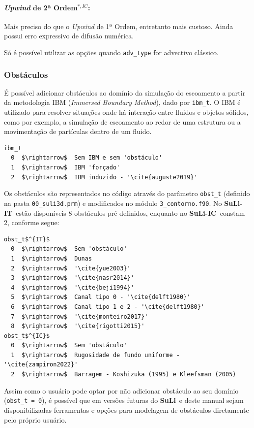 \documentclass[12pt, a4paper]{article}
\newcommand{\SL}{{\bf SuLi}}
\newcommand{\SLIT}{{\bf SuLi-IT}}
\newcommand{\SLIC}{{\bf SuLi-IC}}
\begin{document}
\paragraph{\textit{Upwind} de 2ª Ordem$^{*,IC}$:} Mais preciso do que o \textit{Upwind} de 1ª Ordem, entretanto mais custoso. Ainda possui erro expressivo de difusão numérica. 

\vspace{0.5cm}
\noindent *Só é possível utilizar as opções quando \verb|adv_type| for advectivo clássico.

\subsubsection{Obstáculos} \label{obst}
É possível adicionar obstáculos ao domínio da simulação do escoamento a partir da metodologia IBM (\textit{Immersed Boundary Method}), dado por \verb|ibm_t|. O IBM é utilizado para resolver situações onde há interação entre fluidos e objetos sólidos, como por exemplo, a simulação de escoamento ao redor de uma estrutura ou a movimentação de partículas dentro de um fluido.

\begin{lstlisting}[escapeinside='']
ibm_t	
  0  $\rightarrow$  Sem IBM e sem 'obstáculo'
  1  $\rightarrow$  IBM 'forçado'
  2  $\rightarrow$  IBM induzido - '\cite{auguste2019}'
\end{lstlisting}

Os obstáculos são representados no código através do parâmetro \verb|obst_t| (definido na pasta \verb|00_suli3d.prm|) e modificados no módulo \verb|3_contorno.f90|. No \SLIT\ estão disponíveis 8 obstáculos pré-definidos, enquanto no \SLIC\ constam 2, conforme segue:

\begin{lstlisting}[escapeinside='']
obst_t$^{IT}$	
  0  $\rightarrow$  Sem 'obstáculo'
  1  $\rightarrow$  Dunas
  2  $\rightarrow$  '\cite{yue2003}'
  3  $\rightarrow$  '\cite{nasr2014}'
  4  $\rightarrow$  '\cite{beji1994}'
  5  $\rightarrow$  Canal tipo 0 - '\cite{delft1980}'
  6  $\rightarrow$  Canal tipo 1 e 2 - '\cite{delft1980}'
  7  $\rightarrow$  '\cite{monteiro2017}'
  8  $\rightarrow$  '\cite{rigotti2015}'
obst_t$^{IC}$	
  0  $\rightarrow$  Sem 'obstáculo'
  1  $\rightarrow$  Rugosidade de fundo uniforme - '\cite{zampiron2022}'
  2  $\rightarrow$  Barragem - Koshizuka (1995) e Kleefsman (2005)
\end{lstlisting}

Assim como o usuário pode optar por não adicionar obstáculo ao seu domínio (\verb|obst_t = 0|), é possível que em versões futuras do \SL\ e deste manual sejam disponibilizadas ferramentas e opções para modelagem de obstáculos diretamente pelo próprio usuário.
\end{document}
